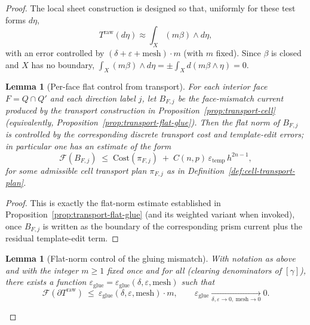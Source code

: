 \documentclass[11pt]{article}
\numberwithin{equation}{section}  %
\theoremstyle{plain}
\newtheorem{lemma}[theorem]{Lemma}
\theoremstyle{definition}
\theoremstyle{remark}
\begin{document}
\begin{proof}
The local sheet construction is designed so that, uniformly for these test forms $d\eta$,
\[
T^{\mathrm{raw}}(d\eta)\approx \int_X (m\beta)\wedge d\eta,
\]
with an error controlled by {$(\delta+\varepsilon+\mathrm{mesh})\cdot m$} (with $m$ fixed).
Since $\beta$ is closed and $X$ has no boundary, $\int_X (m\beta)\wedge d\eta=\pm\int_X d(m\beta\wedge \eta)=0$.



\begin{lemma}[Per-face flat control from transport]\label{lem:per-cell-flat-control}
For each interior face $F=Q\cap Q'$ and each direction label $j$, let $B_{F,j}$ be the face-mismatch current produced by the transport construction in Proposition~\ref{prop:transport-cell} (equivalently, Proposition~\ref{prop:transport-flat-glue}). Then the flat norm of $B_{F,j}$ is controlled by the corresponding discrete transport cost and template-edit errors; in particular one has an estimate of the form
\[
\mathcal F(B_{F,j})\;\le\;\mathrm{Cost}(\pi_{F,j})\;+\;C(n,p)\,\varepsilon_{\mathrm{temp}}\,h^{2n-1},
\]
for some admissible cell transport plan $\pi_{F,j}$ as in Definition~\ref{def:cell-transport-plan}.
\end{lemma}
\begin{proof}
This is exactly the flat-norm estimate established in Proposition~\ref{prop:transport-flat-glue} (and its weighted variant when invoked), once $B_{F,j}$ is written as the boundary of the corresponding prism current plus the residual template-edit term.
\end{proof}

\begin{lemma}[Flat-norm control of the gluing mismatch]\label{lem:flatnorm-gluing-mismatch}
With notation as above and with the integer $m\ge1$ \emph{fixed once and for all} (clearing denominators of $[\gamma]$),
there exists a function $\varepsilon_{\mathrm{glue}}=\varepsilon_{\mathrm{glue}}(\delta,\varepsilon,\mathrm{mesh})$ such that
\[
\mathcal F\!\left(\partial T^{\mathrm{raw}}\right)\ \le\ {\varepsilon_{\mathrm{glue}}(\delta,\varepsilon,\mathrm{mesh})}\cdot m,
\qquad
{\varepsilon_{\mathrm{glue}}\xrightarrow[\delta,\varepsilon\to0,\ \mathrm{mesh}\to0]{}0}.
\]
\end{lemma}


\end{proof}
\end{document}

